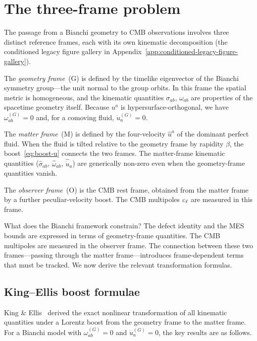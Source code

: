\section{The three-frame problem}\label{sec:frame-problem}

The passage from a Bianchi geometry to CMB observations involves
three distinct reference frames, each with its own kinematic
decomposition (the conditioned legacy figure gallery in Appendix~\ref{app:conditioned-legacy-figure-gallery}).

The \emph{geometry frame}~(G) is defined by the timelike
eigenvector of the Bianchi symmetry group---the unit normal to
the group orbits.  In this frame the spatial metric is
homogeneous, and the kinematic quantities $\sigma_{ab}$,
$\omega_{ab}$ are properties of the spacetime geometry itself.
Because $u^a$ is hypersurface-orthogonal, we have
$\omega_{ab}^{(G)} = 0$ and, for a comoving fluid,
$\dot{u}_a^{(G)} = 0$.

The \emph{matter frame}~(M) is defined by the four-velocity
$\hat{u}^a$ of the dominant perfect fluid.  When the fluid
is tilted relative to the geometry frame by rapidity $\beta$,
the boost~\eqref{eq:boost-u} connects the two frames.  The
matter-frame kinematic quantities ($\hat{\sigma}_{ab}$,
$\hat{\omega}_{ab}$, $\hat{\dot{u}}_a$) are generically
non-zero even when the geometry-frame quantities vanish.

The \emph{observer frame}~(O) is the CMB rest frame,
obtained from the matter frame by a further peculiar-velocity
boost.  The CMB multipoles $\varepsilon_\ell$ are measured in this
frame.

What does the Bianchi framework constrain?  The defect identity
and the MES bounds are expressed in terms of geometry-frame
quantities.  The CMB multipoles are measured in the observer
frame.  The connection between these two frames---passing
through the matter frame---introduces frame-dependent terms
that must be tracked.  We now derive the relevant transformation
formulas.


\subsection{King--Ellis boost formulae}\label{sec:king-ellis}

King \& Ellis~\cite{KingEllis1973} derived the exact nonlinear
transformation of all kinematic quantities under a Lorentz boost
from the geometry frame to the matter frame.  For a Bianchi
model with $\omega_{ab}^{(G)} = 0$ and
$\dot{u}_a^{(G)} = 0$, the key results are as follows.

